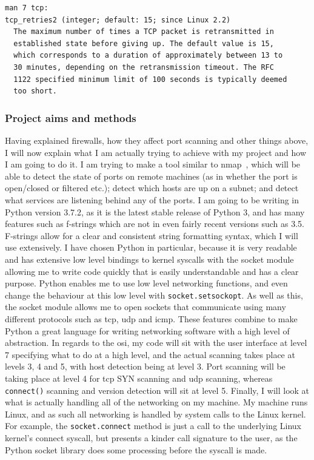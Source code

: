 \documentclass[titlepage]{article}
\let\Oldsubsubsection\subsubsection{}
\renewcommand{\subsubsection}{\FloatBarrier\Oldsubsubsection}
\begin{document}
\begin{verbatim}
man 7 tcp:
tcp_retries2 (integer; default: 15; since Linux 2.2)
  The maximum number of times a TCP packet is retransmitted in
  established state before giving up. The default value is 15,
  which corresponds to a duration of approximately between 13 to
  30 minutes, depending on the retransmission timeout. The RFC
  1122 specified minimum limit of 100 seconds is typically deemed
  too short.
\end{verbatim}

\subsubsection{Project aims and methods}
Having explained firewalls, how they affect port scanning and other things above, I will now explain 
what I am actually trying to achieve with my project and how I am going to do it. I am trying to 
make a tool similar to nmap~\cite{download:nmap}, which will be able to detect the state
of ports on remote machines (as in whether the port is open/closed or filtered etc.);
detect which hosts are up on a subnet; and detect what services are listening behind any of the ports.
I am going to be writing in Python version 3.7.2, as it is the latest stable release of Python 3,
and has many features such as f-strings which are not in even fairly recent versions such as 3.5.
F-strings allow for a clear and consistent string formatting syntax, which I will use extensively.
I have chosen Python in particular, because it is very readable and has extensive low level bindings
to kernel syscalls with the socket module allowing me to write code quickly that is easily 
understandable and has a clear purpose. Python enables me to use low level networking 
functions, and even change the behaviour at this low level with \verb|socket.setsockopt|. As well 
as this, the socket module allows me to open sockets that communicate using many different protocols 
such as \gls{tcp}, \gls{udp} and \gls{icmp}. These features combine to make 
Python a great language for writing networking software with a high level of abstraction. In regards 
to the \gls{osi}, my code will sit with the user interface at level 7 specifying what to do at a high 
level, and the actual scanning takes place at levels 3, 4 and 5, with host detection being at level 
3. Port scanning will be taking place at level 4 for \gls{tcp} SYN scanning and \gls{udp} scanning,
whereas \verb|connect()| scanning and version detection will sit at level 5. Finally, I will look at 
what is actually handling all of the networking on my machine. My machine runs Linux, and as such all 
networking is handled by system calls to the Linux kernel. For example, the \verb|socket.connect| 
method is just a call to the underlying Linux kernel's connect syscall, but presents a kinder call 
signature to the user, as the Python socket library does some processing before the syscall is made.
\end{document}
